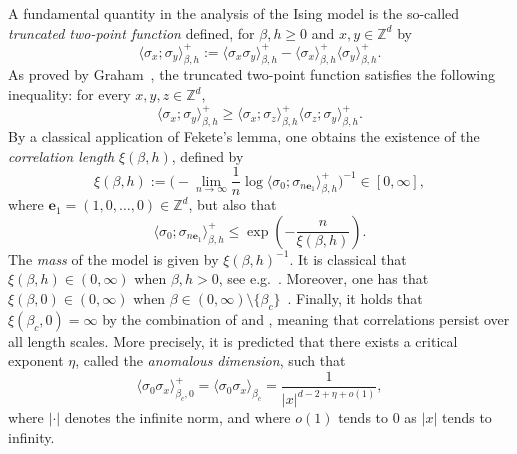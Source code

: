 \documentclass[10pt,a4paper]{amsart}
\numberwithin{equation}{section}
\begin{document}
A fundamental quantity in the analysis of the Ising model is the so-called \emph{truncated two-point function} defined, for $\beta,h\geq 0$ and $x,y\in \mathbb Z^d$ by
\begin{equation}
	\langle \sigma_x;\sigma_y\rangle_{\beta,h}^+:=\langle \sigma_x\sigma_y\rangle_{\beta,h}^+-\langle \sigma_x\rangle_{\beta,h}^+\langle \sigma_y\rangle_{\beta,h}^+.
\end{equation}
As proved by Graham~\cite{graham1982correlation}, the truncated two-point 
function satisfies the following inequality: for every $x,y,z\in\mathbb{Z}^d$,
\begin{equation}
    \langle\sigma_x;\sigma_y\rangle_{\beta,h}^+
    \geq\langle\sigma_x;\sigma_z\rangle_{\beta,h}^+
    \langle\sigma_z;\sigma_y\rangle_{\beta,h}^+.
\end{equation}
By a classical application of Fekete's lemma, one obtains the existence 
of the \emph{correlation length} $\xi(\beta,h)$, defined by
\begin{equation}\label{eq:def correlation length intro}
    \xi(\beta,h)
    :=\Big(
       -\lim_{n\to\infty}\frac{1}{n}
       \log\langle\sigma_0;\sigma_{n\mathbf{e}_1}\rangle_{\beta,h}^+
    \Big)^{-1}\in [0,\infty],
\end{equation}
where $\mathbf{e}_1=(1,0,\ldots,0)\in \mathbb Z^d$, but also that
\begin{equation}\label{eq:bound truncated fekete}
	\langle \sigma_0;\sigma_{n\mathbf{e}_1}\rangle_{\beta,h}^+\leq \exp\left(-\frac{n}{\xi(\beta,h)}\right).
\end{equation}
The \emph{mass} of the model is given by $\xi(\beta,h)^{-1}$.
It is classical that $\xi(\beta,h)\in(0,\infty)$ when $\beta,h>0$, see e.g.~\cite[Theorem~1.2]{ott2020sharp}. Moreover, one has that $\xi(\beta,0)\in(0,\infty)$ 
when $\beta\in (0,\infty)\setminus\{\beta_c\}$~\cite{AizenmanBarskyFernandezSharpnessIsing1987,DuminilTassionNewProofSharpness2016,duminil2020exponential}. Finally, it holds that $\xi(\beta_c,0)=\infty$ by the combination of \cite{SimonInequalityIsing1980} and \cite{AizenmanDuminilSidoraviciusContinuityIsing2015}, meaning that correlations persist over all length scales. More precisely, it is predicted \cite{Widom1965equation} that there exists a critical exponent $\eta$, called the \emph{anomalous dimension}, such that
\begin{equation}\label{eq:def eta}
	\langle \sigma_0\sigma_x\rangle_{\beta_c,0}^+=\langle \sigma_0\sigma_x\rangle_{\beta_c}=\frac{1}{|x|^{d-2+\eta+o(1)}},
\end{equation}
where $|\cdot|$ denotes the infinite norm, and where $o(1)$ tends to $0$ as $|x|$ tends to infinity. 
\end{document}
